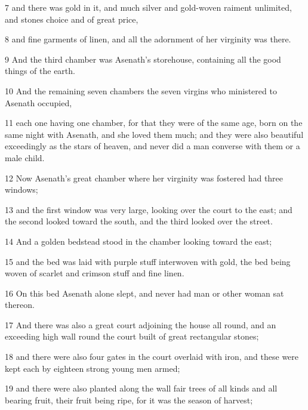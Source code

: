 \par 7 and there was gold in it, and much silver and gold-woven raiment unlimited, and stones choice and of great price, 

\par 8 and fine garments of linen, and all the adornment of her virginity was there. 

\par 9 And the third chamber was Asenath's storehouse, containing all the good things of the earth. 

\par 10 And the remaining seven chambers the seven virgins who ministered to Asenath occupied, 

\par 11 each one having one chamber, for that they were of the same age, born on the same night with Asenath, and she loved them much; and they were also beautiful exceedingly as the stars of heaven, and never did a man converse with them or a male child. 

\par 12 Now Asenath's great chamber where her virginity was fostered had three windows; 

\par 13 and the first window was very large, looking over the court to the east; and the second looked toward the south, and the third looked over the street. 

\par 14 And a golden bedstead stood in the chamber looking toward the east; 

\par 15 and the bed was laid with purple stuff interwoven with gold, the bed being woven of scarlet and crimson stuff and fine linen. 

\par 16 On this bed Asenath alone slept, and never had man or other woman sat thereon. 

\par 17 And there was also a great court adjoining the house all round, and an exceeding high wall round the court built of great rectangular stones; 

\par 18 and there were also four gates in the court overlaid with iron, and these were kept each by eighteen strong young men armed; 

\par 19 and there were also planted along the wall fair trees of all kinds and all bearing fruit, their fruit being ripe, for it was the season of harvest; 

